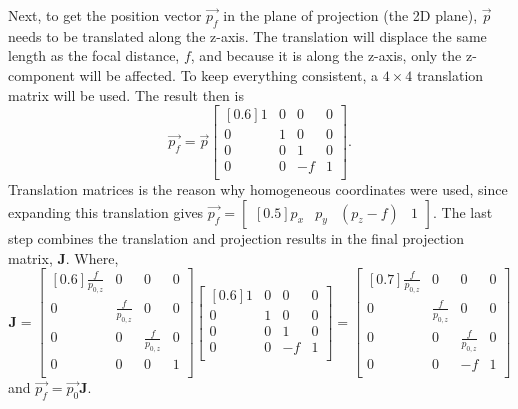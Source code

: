 \documentclass[12pt, letterpaper]{article}
\begin{document}
Next, to get the position vector $\vec{p_f}$ in the plane of projection (the 2D plane), $\vec{p}$ needs to be translated along the z-axis. The translation will displace the same length as the focal distance, $f$, and because it is along the z-axis, only the z-component will be affected. To keep everything consistent, a $4\times4$ translation matrix will be used. The result then is
$$\vec{p_f} = \vec{p} \begin{bmatrix}[0.6] 1 & 0 & 0 & 0\\ 0 & 1 & 0 & 0 \\ 0 & 0 & 1 & 0 \\ 0 & 0 & -f & 1\\   \end{bmatrix}.$$
Translation matrices is the reason why homogeneous coordinates were used, since expanding this translation gives $\vec{p_f} = \begin{bmatrix}[0.5]p_{x}&p_{y}&(p_{z}-f)&1 \end{bmatrix}$. The last step combines the translation and projection results in the final projection matrix, $\mathbf{J}$. Where, 
\begin{equation}
    \mathbf{J} = \begin{bmatrix}[0.6] \frac{f}{p_{0, z}} & 0 & 0 & 0\\ 0 & \frac{f}{p_{0, z}} & 0 & 0 \\ 0 & 0 & \frac{f}{p_{0, z}} & 0 \\ 0 & 0 & 0 & 1\\   \end{bmatrix} \begin{bmatrix}[0.6] 1 & 0 & 0 & 0\\ 0 & 1 & 0 & 0 \\ 0 & 0 & 1 & 0 \\ 0 & 0 & -f & 1\\   \end{bmatrix} = \begin{bmatrix}[0.7] \frac{f}{p_{0, z}} & 0 & 0 & 0\\ 0 & \frac{f}{p_{0, z}} & 0 & 0 \\ 0 & 0 & \frac{f}{p_{0, z}} & 0 \\ 0 & 0 & -f & 1\\   \end{bmatrix}
\end{equation}
and $\vec{p_f} = \vec{p_0}\mathbf{J}$.
\end{document}
